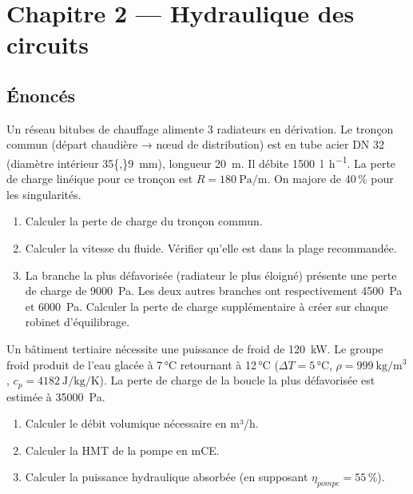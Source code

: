 \chapter*{Chapitre 2 — Hydraulique des circuits}

\section*{Énoncés}


Un réseau bitubes de chauffage alimente 3 radiateurs en dérivation. Le tronçon commun (départ chaudière → nœud de distribution) est en tube acier DN 32 (diamètre intérieur \SI{35{,}9}{\milli\metre}), longueur \SI{20}{\metre}. Il débite \SI{1500}{\litre\per\hour}. La perte de charge linéique pour ce tronçon est $R = \SI{180}{\pascal\per\metre}$. On majore de 40\,\% pour les singularités.

\begin{enumerate}
  \item Calculer la perte de charge du tronçon commun.
  \item Calculer la vitesse du fluide. Vérifier qu'elle est dans la plage recommandée.
  \item La branche la plus défavorisée (radiateur le plus éloigné) présente une perte de charge de \SI{9000}{\pascal}. Les deux autres branches ont respectivement \SI{4500}{\pascal} et \SI{6000}{\pascal}. Calculer la perte de charge supplémentaire à créer sur chaque robinet d'équilibrage.
\end{enumerate}



Un bâtiment tertiaire nécessite une puissance de froid de \SI{120}{\kilo\watt}. Le groupe froid produit de l'eau glacée à 7\,°C retournant à 12\,°C ($\Delta T = 5$\,°C, $\rho = \SI{999}{\kilogram\per\cubic\metre}$, $c_p = \SI{4182}{\joule\per\kilogram\per\kelvin}$). La perte de charge de la boucle la plus défavorisée est estimée à \SI{35000}{\pascal}.

\begin{enumerate}
  \item Calculer le débit volumique nécessaire en m³/h.
  \item Calculer la HMT de la pompe en mCE.
  \item Calculer la puissance hydraulique absorbée (en supposant $\eta_{pompe} = 55\,\%$).
\end{enumerate}

